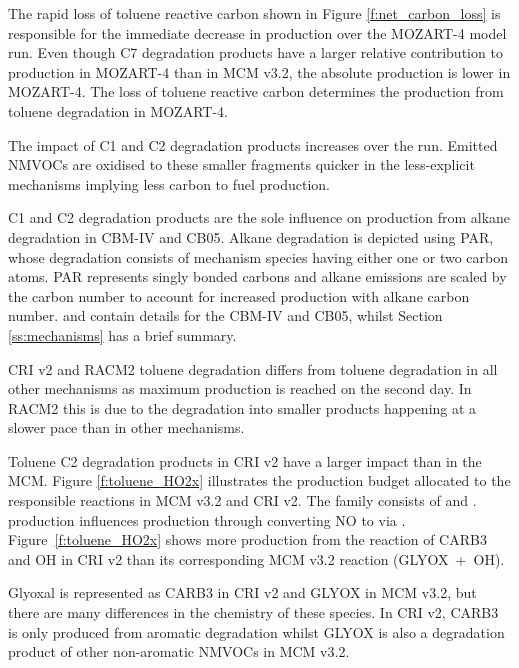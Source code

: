 The rapid loss of toluene reactive carbon shown in Figure \ref{f:net_carbon_loss} is responsible for the immediate decrease in  production over the MOZART-4 model run.
Even though C7 degradation products have a larger relative contribution to  production in MOZART-4 than in MCM v3.2, the absolute  production is lower in MOZART-4.
The loss of toluene reactive carbon determines the  production from toluene degradation in MOZART-4.

The impact of C1 and C2 degradation products increases over the run.
Emitted NMVOCs are oxidised to these smaller fragments quicker in the less-explicit mechanisms implying less carbon to fuel  production.

C1 and C2 degradation products are the sole influence on  production from alkane degradation in CBM-IV and CB05.
Alkane degradation is depicted using PAR, whose degradation consists of mechanism species having either one or two carbon atoms.
PAR represents singly bonded carbons and alkane emissions are scaled by the carbon number to account for increased  production with alkane carbon number.
\citet{Hogo:1989} and \citet{Yarwood:2005} contain details for the CBM-IV and CB05, whilst Section \ref{ss:mechanisms} has a brief summary.

CRI v2 and RACM2 toluene degradation differs from toluene degradation in all other mechanisms as maximum  production is reached on the second day. 
In RACM2 this is due to the degradation into smaller products happening at a slower pace than in other mechanisms.

Toluene C2 degradation products in CRI v2 have a larger impact than in the MCM.  
Figure \ref{f:toluene_HO2x} illustrates the  production budget allocated to the responsible reactions in MCM v3.2 and CRI v2. 
The  family consists of  and .
 production influences  production through  converting NO to  via .
\mbox{Figure \ref{f:toluene_HO2x}} shows more  production from the reaction of CARB3 and OH in CRI v2 than its corresponding MCM v3.2 reaction (\mbox{GLYOX + OH}).

Glyoxal is represented as CARB3 in CRI v2 and GLYOX in MCM v3.2, but there are many differences in the chemistry of these species.
In CRI v2, CARB3 is only produced from aromatic degradation whilst GLYOX is also a degradation product of other non-aromatic NMVOCs in MCM v3.2. 

